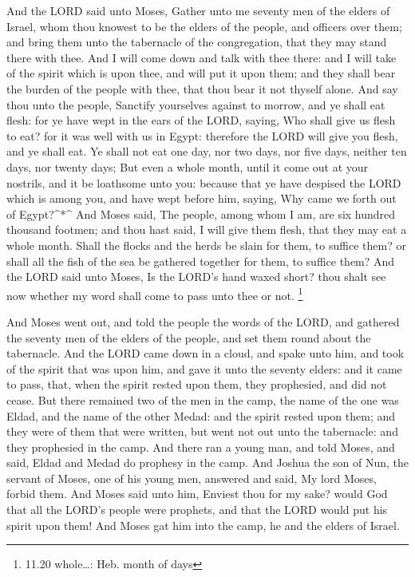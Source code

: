  And the LORD said unto Moses, Gather unto me seventy men
of the elders of Israel, whom thou knowest to be the elders of the
people, and officers over them; and bring them unto the tabernacle of
the congregation, that they may stand there with thee.  And
I will come down and talk with thee there: and I will take of the spirit
which is upon thee, and will put it upon them; and they shall bear the
burden of the people with thee, that thou bear it not thyself alone.
 And say thou unto the people, Sanctify yourselves against
to morrow, and ye shall eat flesh: for ye have wept in the ears of the
LORD, saying, Who shall give us flesh to eat? for it was well with us in
Egypt: therefore the LORD will give you flesh, and ye shall eat.
 Ye shall not eat one day, nor two days, nor five days,
neither ten days, nor twenty days;  But even a whole month,
until it come out at your nostrils, and it be loathsome unto you:
because that ye have despised the LORD which is among you, and have wept
before him, saying, Why came we forth out of Egypt?\^{}*\^{}
 And Moses said, The people, among whom I am, are six
hundred thousand footmen; and thou hast said, I will give them flesh,
that they may eat a whole month.  Shall the flocks and the
herds be slain for them, to suffice them? or shall all the fish of the
sea be gathered together for them, to suffice them?  And
the LORD said unto Moses, Is the LORD's hand waxed short? thou shalt see
now whether my word shall come to pass unto thee or not. \footnote{11.20
  whole\ldots: Heb. month of days}

 And Moses went out, and told the people the words of the
LORD, and gathered the seventy men of the elders of the people, and set
them round about the tabernacle.  And the LORD came down in
a cloud, and spake unto him, and took of the spirit that was upon him,
and gave it unto the seventy elders: and it came to pass, that, when the
spirit rested upon them, they prophesied, and did not cease.
 But there remained two of the men in the camp, the name of
the one was Eldad, and the name of the other Medad: and the spirit
rested upon them; and they were of them that were written, but went not
out unto the tabernacle: and they prophesied in the camp. 
And there ran a young man, and told Moses, and said, Eldad and Medad do
prophesy in the camp.  And Joshua the son of Nun, the
servant of Moses, one of his young men, answered and said, My lord
Moses, forbid them.  And Moses said unto him, Enviest thou
for my sake? would God that all the LORD's people were prophets, and
that the LORD would put his spirit upon them!  And Moses
gat him into the camp, he and the elders of Israel.

